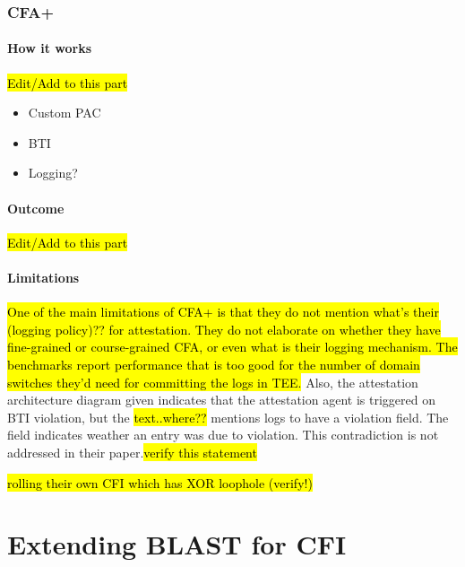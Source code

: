 \documentclass[a4paper, nobind]{templates/ociamthesis}
\providecommand{\tightlist}{%
  \setlength{\itemsep}{0pt}\setlength{\parskip}{0pt}}
\begin{document}
\subsection{CFA+}\label{cfa-1}

\subsubsection{How it works}\label{how-it-works-1}

\hl{Edit/Add to this part}

\begin{itemize}
\tightlist
\item
  Custom PAC
\item
  BTI
\item
  Logging?
\end{itemize}

\subsubsection{Outcome}\label{outcome-1}

\hl{Edit/Add to this part}

\subsubsection{Limitations}\label{limitations-1}

\hl{One of the main limitations of CFA+ is that they do not mention what's their
(logging policy)?? for attestation. They do not elaborate on whether they have
fine-grained or course-grained CFA, or even what is their logging mechanism.
The benchmarks report performance that is too good for the number of domain
switches they'd need for committing the logs in TEE.}
Also, the attestation architecture diagram given indicates that the attestation
agent is triggered on BTI violation, but the \hl{text..where??}
mentions logs to have a violation field. The field indicates weather an entry was due to violation.
This contradiction is not addressed in their paper.\hl{verify this statement}

\hl{rolling their own CFI which has XOR loophole (verify!)}

\chapter{Extending BLAST for CFI}\label{extending-blast-for-cfi}
\end{document}
